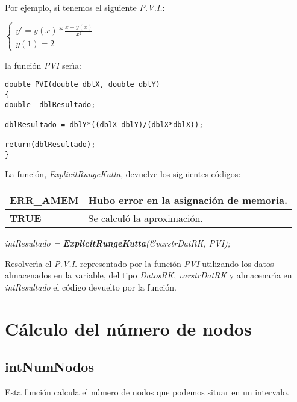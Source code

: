 Por ejemplo, si tenemos el siguiente \emph{P.V.I.}:

\begin{center}
$
\left \{ \begin{array}{l}
y' = y(x) * \frac{x-y(x)}{x^2} \\
y(1) = 2
\end{array} \right.
$
\end{center}

la funci\'on \emph{PVI} ser\'{\i}a:

\begin{verbatim}
double PVI(double dblX, double dblY)
{
double  dblResultado;

dblResultado = dblY*((dblX-dblY)/(dblX*dblX));

return(dblResultado);
}
\end{verbatim}

La funci\'on, \emph{ExplicitRungeKutta}, devuelve los siguientes c\'odigos:

\begin{center}
\begin{tabular}{|l|l|}
\hline
\textbf{ERR\_AMEM} & Hubo error en la asignaci\'on de memoria. \\
\hline
\textbf{TRUE} & Se calcul\'o la aproximaci\'on. \\
\hline
\end{tabular}
\end{center}

\begin{center}
\emph{intResultado = \textbf{ExplicitRungeKutta}(\&varstrDatRK, PVI);}
\end{center}

Resolver\'{\i}a el \emph{P.V.I.} representado por la funci\'on \emph{PVI} 
utilizando los datos almacenados en la variable, del tipo \emph{DatosRK},
\emph{varstrDatRK} y almacenar\'{\i}a en \emph{intResultado} el c\'odigo
devuelto por la funci\'on.

\section{C\'alculo del n\'umero de nodos}

\subsection{intNumNodos}
Esta funci\'on calcula el n\'umero de nodos que podemos situar en un
intervalo.\newline

